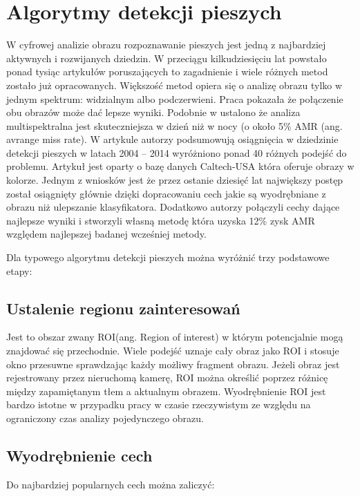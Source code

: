 \section{Algorytmy detekcji pieszych}

W cyfrowej analizie obrazu rozpoznawanie pieszych jest jedną z najbardziej aktywnych i rozwijanych dziedzin. W przeciągu kilkudziesięciu lat powstało ponad tysiąc artykułów poruszających to zagadnienie \cite{zhang2015filtered} i wiele różnych metod zostało już opracowanych. Większość metod opiera się o analizę obrazu tylko w jednym spektrum: widzialnym albo podczerwieni. Praca \cite{hwang2015multispectral} pokazała że połączenie obu obrazów może dać lepsze wyniki. Podobnie w \cite{gonzalez2016pedestrian} ustalono że analiza multispektralna jest skuteczniejsza w dzień niż w nocy (o około 5\% AMR (ang. avrange miss rate).   W artykule \cite{benenson2014ten} autorzy podsumowują osiągnięcia w dziedzinie detekcji pieszych w latach 2004 – 2014 wyróżniono ponad 40 różnych podejść do problemu. Artykuł jest oparty o bazę danych Caltech-USA która oferuje obrazy w kolorze. Jednym z wniosków jest że przez ostanie dziesięć lat największy postęp został osiągnięty głównie dzięki dopracowaniu cech jakie są wyodrębniane z obrazu niż ulepszanie klasyfikatora. Dodatkowo autorzy połączyli cechy dające najlepsze wyniki i stworzyli własną metodę która uzyska 12\% zysk AMR względem  najlepszej badanej wcześniej metody.

Dla typowego algorytmu detekcji pieszych można wyróżnić trzy podstawowe etapy:

\subsection{Ustalenie regionu zainteresowań} 
Jest to obszar zwany ROI(ang. Region of interest) w którym potencjalnie mogą znajdować się przechodnie. Wiele podejść uznaje cały obraz jako ROI i stosuje okno przesuwne sprawdzając każdy możliwy fragment obrazu. Jeżeli obraz jest rejestrowany przez nieruchomą kamerę, ROI można określić poprzez różnicę między zapamiętanym tłem a aktualnym obrazem. Wyodrębnienie ROI jest bardzo istotne w przypadku pracy w czasie rzeczywistym ze względu na ograniczony czas analizy pojedynczego obrazu.

\subsection{Wyodrębnienie cech}
Do najbardziej popularnych cech można zaliczyć:

